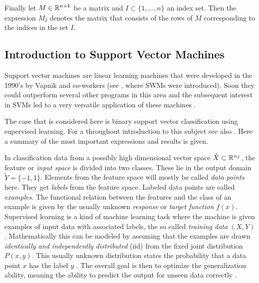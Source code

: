 Finally let \(M \in \mathbb{R}^{n\times k}\) be a matrix and \(I \subset \{1,...,n\}\) an index set. Then the expression \(M_{I}\) denotes the matrix that consists of the rows of \(M\) corresponding to the indices in the set \(I\). %

%

\subsection{Introduction to Support Vector Machines}
Support vector machines are linear learning machines that were developed in the 1990's by Vapnik and co-workers (see \cite{Boser1992}, where SWMs were introduced). Soon they could outperform several other programs in this area \cite{Cristianini2000} and the subsequent interest in SVMs led to a very versatile application of these machines \cite{Kunapuli2008}.

The case that is considered here is binary support vector classification using supervised learning. 
For a throughout introduction to this subject see also \cite{Cristianini2000}. Here a summary of the most important expressions and results is given.

In classification data from a possibly high dimensional vector space \(\tilde{X} \subset \mathbb{R}^{n_f}\), the feature or \emph{input space} is divided into two classes. These lie in the output domain \(\tilde{Y} = \{-1,1\}\). Elements from the feature space will mostly be called \emph{data points} here. They get \emph{labels} from the feature space. Labeled data points are called \emph{examples}.
The functional relation between the features and the class of an example is given by the usually unknown \emph{response} or \emph{target function} \(f(x)\).
Supervised learning is a kind of machine learning task where the machine is given examples of input data with associated labels, the so called \emph{training data} \((X,Y)\). Mathematically this can be modeled by assuming that the examples are  drawn \emph{identically and independently distributed} (iid) from the fixed joint distribution \(P(x,y)\). This usually unknown distribution states the probability that a data point \(x\) has the label \(y\) \cite[p. 988]{Vapnik1999}.
The overall goal is then to optimize the generalization ability, meaning the ability to predict the output for unseen data correctly \cite[chapter 1.2]{Cristianini2000}.

